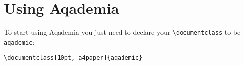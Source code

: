 \section{Using Aqademia}

To start using Aqademia you just need to declare your \texttt{\textbackslash{}documentclass} to be \texttt{aqademic}:

\begin{lstlisting}[language=Tex]
\documentclass[10pt, a4paper]{aqademic}
\end{lstlisting}
